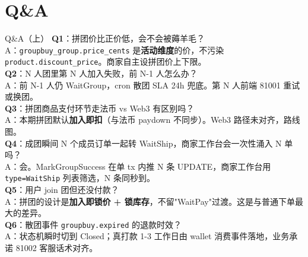 \documentclass[aspectratio=169,11pt]{beamer}
\begin{document}
\section{Q\&A}

\begin{frame}[shrink]{Q\&A（上）}
\small
\textbf{Q1}：拼团价比正价低，会不会被薅羊毛？\\
\hspace{4mm}\small A：\texttt{groupbuy\_group.price\_cents} 是\textbf{活动维度}的价，不污染 \texttt{product.discount\_price}。商家自主设拼团价上下限。\\

\vspace{1mm}
\textbf{Q2}：N 人团里第 N 人加入失败，前 N-1 人怎么办？\\
\hspace{4mm}\small A：前 N-1 人仍 WaitGroup，cron 散团 SLA 24h 兜底。第 N 人前端 81001 重试或换团。\\

\vspace{1mm}
\textbf{Q3}：拼团商品支付环节走法币 vs Web3 有区别吗？\\
\hspace{4mm}\small A：本期拼团默认\textbf{加入即扣}（与法币 paydown 不同步）。Web3 路径未对齐，路线图。\\

\vspace{1mm}
\textbf{Q4}：成团瞬间 N 个成员订单一起转 WaitShip，商家工作台会一次性涌入 N 单吗？\\
\hspace{4mm}\small A：会。MarkGroupSuccess 在单 tx 内推 N 条 UPDATE，商家工作台用 \texttt{type=WaitShip} 列表筛选，N 条同秒到。\\

\vspace{1mm}
\textbf{Q5}：用户 join 团但还没付款？\\
\hspace{4mm}\small A：拼团的设计是\textbf{加入即锁价 + 锁库存}，不留"WaitPay"过渡。这是与普通下单最大的差异。\\

\vspace{1mm}
\textbf{Q6}：散团事件 \texttt{groupbuy.expired} 的退款时效？\\
\hspace{4mm}\small A：状态机瞬时切到 Closed；真打款 1-3 工作日由 wallet 消费事件落地，业务承诺 81002 客服话术对齐。\\
\end{frame}
\end{document}
